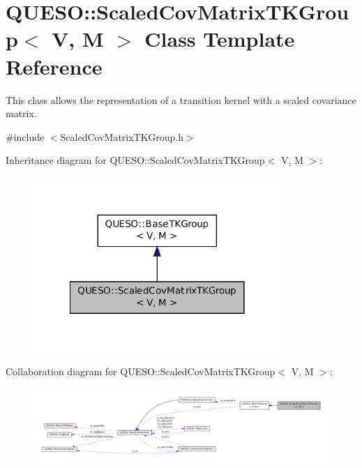 \hypertarget{class_q_u_e_s_o_1_1_scaled_cov_matrix_t_k_group}{\section{Q\-U\-E\-S\-O\-:\-:Scaled\-Cov\-Matrix\-T\-K\-Group$<$ V, M $>$ Class Template Reference}
\label{class_q_u_e_s_o_1_1_scaled_cov_matrix_t_k_group}
}


This class allows the representation of a transition kernel with a scaled covariance matrix.  




{\ttfamily \#include $<$Scaled\-Cov\-Matrix\-T\-K\-Group.\-h$>$}



Inheritance diagram for Q\-U\-E\-S\-O\-:\-:Scaled\-Cov\-Matrix\-T\-K\-Group$<$ V, M $>$\-:
\nopagebreak
\begin{figure}[H]
\begin{center}
\leavevmode
\includegraphics[width=266pt]{class_q_u_e_s_o_1_1_scaled_cov_matrix_t_k_group__inherit__graph}
\end{center}
\end{figure}


Collaboration diagram for Q\-U\-E\-S\-O\-:\-:Scaled\-Cov\-Matrix\-T\-K\-Group$<$ V, M $>$\-:
\nopagebreak
\begin{figure}[H]
\begin{center}
\leavevmode
\includegraphics[width=350pt]{class_q_u_e_s_o_1_1_scaled_cov_matrix_t_k_group__coll__graph}
\end{center}
\end{figure}
